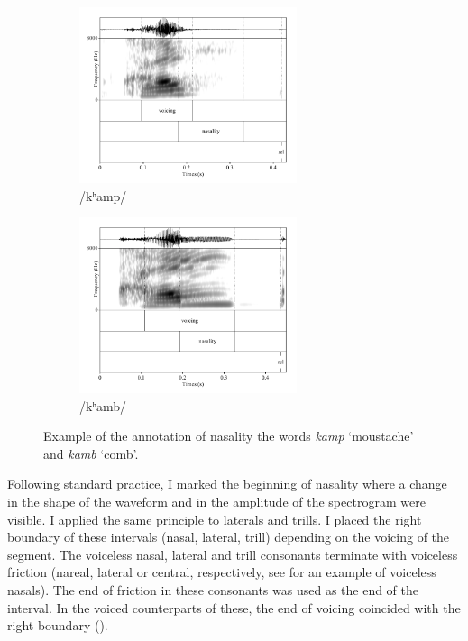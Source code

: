 \documentclass[11pt,a4paper,openany]{memoir}\usepackage[]{graphicx}\usepackage[]{color}
\begin{document}
\begin{figure}
\begin{subfigure}{\textwidth}
\centering
\includegraphics[width=0.7\textwidth]{kamp}
\caption{/kʰamp/}
\label{f:kamp}
\end{subfigure}
\begin{subfigure}{\textwidth}
\centering
\includegraphics[width=0.7\textwidth]{kamb}
\caption{/kʰamb/}
\label{f:kamb}
\end{subfigure}
\caption[Annotation of nasality]{Example of the annotation of nasality the words \textit{kamp} `moustache' and \textit{kamb} `comb'.
}
\label{f:nasality}
\end{figure}

Following standard practice, I marked the beginning of nasality where a change in the shape of the waveform and in the amplitude of the spectrogram were visible.
I applied the same principle to laterals and trills.
I placed the right boundary of these intervals (nasal, lateral, trill) depending on the voicing of the segment.
The voiceless nasal, lateral and trill consonants terminate with voiceless friction (nareal, lateral or central, respectively, see  for an example of voiceless nasals).
The end of friction in these consonants was used as the end of the interval.
In the voiced counterparts of these, the end of voicing coincided with the right boundary ().
\end{document}
